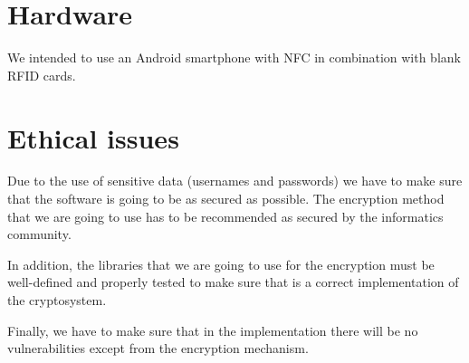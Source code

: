 \documentclass[11pt]{article}
\begin{document}
\clearpage

\section{Hardware}
We intended to use an Android smartphone with NFC in combination with blank RFID cards. 

\section{Ethical issues}
Due to the use of sensitive data (usernames and passwords) we have to make sure that the software is going to be as secured as possible. The encryption method that we are going to use has to be recommended as secured by the informatics community.

In addition, the libraries that we are going to use for the encryption must be well-defined and properly tested to make sure that is a correct implementation of the cryptosystem.

Finally, we have to make sure that in the implementation there will be no vulnerabilities except from the encryption mechanism.


\end{document}
